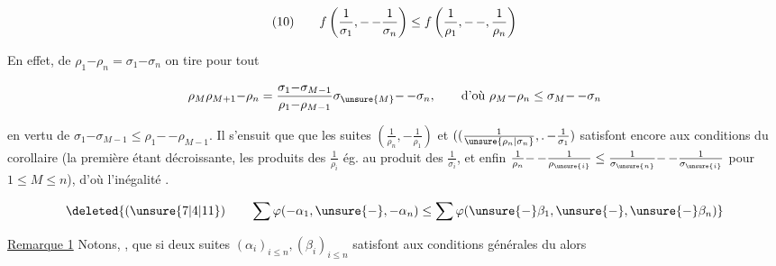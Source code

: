 \[
\begin{array}{@{}l@{\qquad}l@{}}
(10)&\displaystyle f\left(\frac1{\sigma_1},\mathord{-}\,\mathord{-}\frac1{\sigma_n}\right)\leq f\left(\frac1{\rho_1},\mathord{-}\,\mathord{-},\frac1{\rho_n}\right)
\end{array}
\]

En effet, de $\rho_1\mathord{-}\rho_n=\sigma_1\mathord{-}\sigma_n$ on tire pour tout
{\reversemarginpar{}}

\[
\rho_M\rho_{M+1}\mathord{-}\rho_n=\frac{\sigma_1\mathord{-}\sigma_{M-1}}{\rho_1\mathord{-}\rho_{M-1}}\sigma_{\unsure{M}}\mathord{-}\,\mathord{-}\sigma_n,\qquad\text{d'où }\rho_M\mathord{-}\rho_n\leq\sigma_M\mathord{-}\,\mathord{-}\sigma_n
\]

en vertu de $\sigma_1\mathord{-}\sigma_{M-1}\leq\rho_1\mathord{-}\,\mathord{-}\rho_{M-1}$. Il s'ensuit que que les suites $(\frac1{\rho_n},\mathord{-}\frac1{\rho_1})$ et $((\frac1{\unsure{\rho_n|\sigma_n}},\mathord{.}\,\mathord{-}\frac1{\sigma_1})$ satisfont encore aux conditions du corollaire (la première étant décroissante, les produits  des $\frac1{\rho_i}$ ég. au produit des $\frac1{\sigma_i}$, et enfin $\frac1{\rho_n}\mathord{-}\,\mathord{-}\frac1{\rho_{\unsure{i}}}\leq\frac1{\sigma_{\unsure{n}}}\mathord{-}\,\mathord{-}\frac1{\sigma_{\unsure{i}}}$ pour $1\leq M\leq n$), d'où l'inégalité .

{\reversemarginpar{}}



\[
\deleted{(\unsure{7|4|11})\qquad \sum\varphi(-\alpha_1,\unsure{\mathord{-}},-\alpha_n)\leq\sum\varphi(\unsure{-}\beta_1,\unsure{\mathord{-}},\unsure{-}\beta_n)}
\]

\uline{Remarque 1} Notons, , que si deux suites $(\alpha_i)_{i\leq n},(\beta_i)_{i\leq n}$ satisfont aux conditions générales du   alors 

